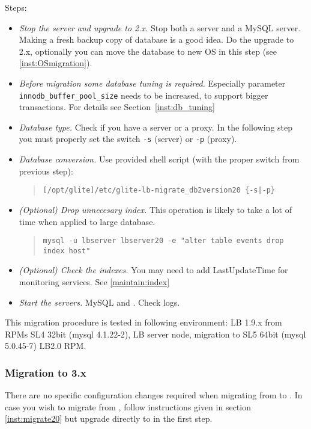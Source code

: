Steps:
\begin{itemize}
 \item \emph{Stop the server and upgrade to \LB 2.x.} Stop both a \LB
 server and a MySQL server. Making a fresh backup copy of database is
 a good idea. Do the upgrade to \LB 2.x, optionally you can move the
 database to new OS in this step (see \ref{inst:OSmigration}).
 \item \emph{Before migration some database tuning is
 required.} Especially parameter \texttt{innodb\_buffer\_pool\_size}
 needs to be increased, to support bigger transactions. For details
 see Section~\ref{inst:db_tuning}
 \item \emph{Database type.} Check if you have a \LB server or a \LB
 proxy. In the following step you must properly set the switch
 \verb'-s' (server) or \verb'-p' (proxy).
 \item \emph{Database conversion.} Use provided shell script (with the proper
  switch from previous step):
  \begin{quote}
  \verb'[/opt/glite]/etc/glite-lb-migrate_db2version20 {-s|-p}'
  \end{quote}
 \item \emph{(Optional) Drop unnecesary index.} This operation is
  likely to take a lot of time when applied to large database.
  \begin{quote}
  \verb'mysql -u lbserver lbserver20 -e "alter table events drop index host"'
  \end{quote}
 \item \emph{(Optional) Check the \LB indexes.} You may need to add
 LastUpdateTime for monitoring services. See \ref{maintain:index}
 \item \emph{Start the servers.} MySQL and \LB. Check logs.
\end{itemize}

This migration procedure is tested in following environment: LB 1.9.x
from RPMs SL4 32bit (mysql 4.1.22-2), LB server node, migration to SL5
64bit (mysql 5.0.45-7) LB2.0 RPM. 

\subsubsection{Migration to \LB 3.x}
\label{inst:migrate30}
There are no specific configuration changes required when migrating from  to . In case you wish to migrate from , follow instructions given in section \ref{inst:migrate20} but upgrade directly to  in the first step.

